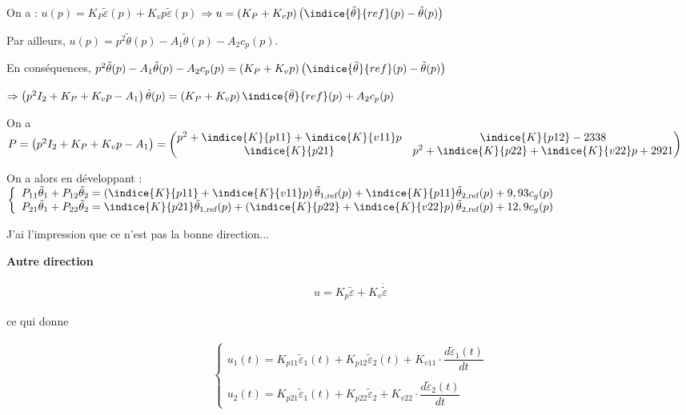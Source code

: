 \documentclass[11pt]{article}
\begin{document}
\begin{UPSTIcorrige}
On a :
$u(p)=K_P\tilde{\varepsilon}(p)+K_v p \tilde{\varepsilon}(p)$
$\Rightarrow u=\left( K_P+K_v p\right) \left(\indice{\tilde{\theta}}{ref}(p) -  \tilde{\theta}(p)\right)$

Par ailleurs, $u(p)=p^2 \tilde{\theta}(p)-A_1 \tilde{\theta}(p) - A_2 c_p(p)$. 

En conséquences, 
$p^2 \tilde{\theta}(p)-A_1 \tilde{\theta}(p) - A_2 c_p(p) =\left( K_P+K_v p\right) \left(\indice{\tilde{\theta}}{ref}(p) -  \tilde{\theta}(p)\right)$

$\Rightarrow 
\left(p^2 I_2 + K_P+K_v p-A_1\right) \tilde{\theta}(p)  =\left( K_P+K_v p\right) \indice{\tilde{\theta}}{ref}(p) + A_2 c_p(p)$

On a $P = \left(p^2 I_2 + K_P+K_v p-A_1\right) = 
\begin{pmatrix}
p^2 + \indice{K}{p11}+\indice{K}{v11}p  & \indice{K}{p12}-2338 \\
\indice{K}{p21} & p^2 + \indice{K}{p22}+\indice{K}{v22}p +2921\\
\end{pmatrix}$

On a alors en développant : 
$\left\{
\begin{array}{l}
P_{11} \tilde{\theta}_1 + P_{12} \tilde{\theta}_2  =  \left(\indice{K}{p11}  +\indice{K}{v11}p\right) \tilde{\theta}_{1,\text{ref}}(p) +\indice{K}{p11}\tilde{\theta}_{2,\text{ref}}(p) + 9,93 c_g (p)\\
P_{21} \tilde{\theta}_1 + P_{22} \tilde{\theta}_2  =  \indice{K}{p21}  \tilde{\theta}_{1,\text{ref}}(p) +\left(\indice{K}{p22} +\indice{K}{v22}p\right) \tilde{\theta}_{2,\text{ref}}(p) + 12,9 c_g (p)\\
\end{array}
\right.
$

J'ai l'impression que ce n'est pas la bonne direction...


\textbf{Autre direction}

\begin{align*}
u=K_p\tilde{\varepsilon}+K_v\dot{\tilde{\varepsilon}}
\end{align*}

ce qui donne 

\begin{align*}
\left\{
\begin{array}{l}
u_1(t)=K_{p11}\tilde{\varepsilon}_1(t)+K_{p12}\tilde{\varepsilon}_2(t)+K_{v11} \cdot \dfrac{d \tilde{\varepsilon}_1(t)}{dt} \\
\\
u_2(t)=K_{p21}\tilde{\varepsilon}_1(t)+K_{p22}\tilde{\varepsilon}_2+K_{v22}\cdot \dfrac{d \tilde{\varepsilon}_2(t)}{dt}
\end{array}
\right.
\end{align*}


\end{UPSTIcorrige}
\end{document}
